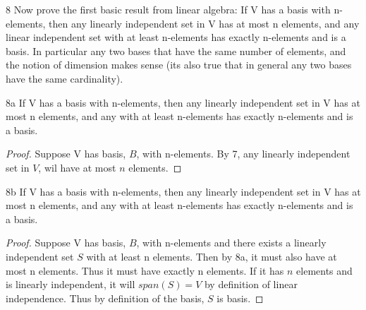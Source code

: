 \documentclass{article}
\begin{document}
\begin{PROB}{8}\label{Problem 8.}
	Now prove the first basic result from linear algebra: If V has a basis with n-elements, then any linearly independent set in V has at most n elements, and any linear independent set with at least n-elements has exactly n-elements and is a basis. In particular any two bases that have the same number of elements, and the notion of dimension makes sense (its also true that in general any two bases have the same cardinality). 
\end{PROB}
\begin{claim}{8a}
	If V has a basis with n-elements, then any linearly independent set in V has at most n elements, and any with at least n-elements has exactly n-elements and is a basis.
\end{claim}
\begin{proof}
	Suppose V has basis, $B$, with n-elements. By 7, any linearly independent set in $V$, wil have at most $n$ elements.
\end{proof}
\begin{claim}{8b}
	If V has a basis with n-elements, then any linearly independent set in V has at most n elements, and any with at least n-elements has exactly n-elements and is a basis.
\end{claim}
\begin{proof}
	Suppose V has basis, $B$, with n-elements and there exists a linearly independent set $S$ with at least n elements. Then by 8a, it must also have at most n elements. Thus it must have exactly n elements. If it has $n$ elements and is linearly independent, it will $span(S) = V$ by definition of linear independence. Thus by definition of the basis, $S$ is basis.
\end{proof}
\end{document}
